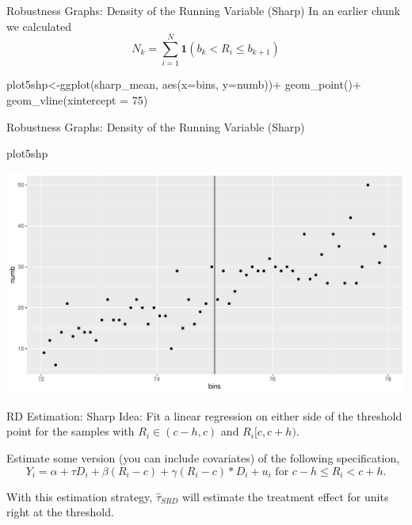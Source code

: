 \documentclass[
  ignorenonframetext,
]{beamer}
\newenvironment{Shaded}{\begin{snugshade}}{\end{snugshade}}
\newcommand{\AttributeTok}[1]{\textcolor[rgb]{0.77,0.63,0.00}{#1}}
\newcommand{\DecValTok}[1]{\textcolor[rgb]{0.00,0.00,0.81}{#1}}
\newcommand{\FunctionTok}[1]{\textcolor[rgb]{0.00,0.00,0.00}{#1}}
\newcommand{\NormalTok}[1]{#1}
\newcommand{\OtherTok}[1]{\textcolor[rgb]{0.56,0.35,0.01}{#1}}
\newcommand{\SpecialCharTok}[1]{\textcolor[rgb]{0.00,0.00,0.00}{#1}}
\begin{document}
\begin{frame}[fragile]{Robustness Graphs: Density of the Running
Variable (Sharp)}
\protect\hypertarget{robustness-graphs-density-of-the-running-variable-sharp}{}
In an earlier chunk we calculated \[
N_k=\sum_{i=1}^N\mathbf{1}(b_k<R_i\leq b_{k+1})
\] \tiny

\begin{Shaded}
\begin{Highlighting}[]
\NormalTok{plot5shp}\OtherTok{\textless{}{-}}\FunctionTok{ggplot}\NormalTok{(sharp\_mean, }\FunctionTok{aes}\NormalTok{(}\AttributeTok{x=}\NormalTok{bins, }\AttributeTok{y=}\NormalTok{numb))}\SpecialCharTok{+} 
         \FunctionTok{geom\_point}\NormalTok{()}\SpecialCharTok{+}
         \FunctionTok{geom\_vline}\NormalTok{(}\AttributeTok{xintercept =} \DecValTok{75}\NormalTok{)}
\end{Highlighting}
\end{Shaded}
\end{frame}

\begin{frame}[fragile]{Robustness Graphs: Density of the Running
Variable (Sharp)}
\protect\hypertarget{robustness-graphs-density-of-the-running-variable-sharp-1}{}
\begin{Shaded}
\begin{Highlighting}[]
\NormalTok{plot5shp}
\end{Highlighting}
\end{Shaded}

\includegraphics{Slides9_RD_files/figure-beamer/sharp5a-1.pdf}
\end{frame}

\begin{frame}{RD Estimation: Sharp}
\protect\hypertarget{rd-estimation-sharp}{}
Idea: Fit a linear regression on either side of the threshold point for
the samples with \(R_i\in (c-h,c)\) and \(R_i[c,c+h)\).

Estimate some version (you can include covariates) of the following
specification, \[
Y_i=\alpha+\tau D_i+\beta(R_i-c)+\gamma (R_i-c)*D_i+u_i \text{ for }  c-h\leq R_i< c+h. 
\]

With this estimation strategy, \(\hat{\tau}_{SRD}\) will estimate the
treatment effect for units right at the threshold.
\end{frame}
\end{document}
